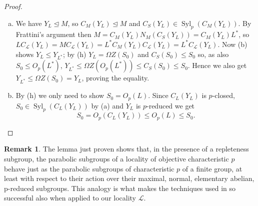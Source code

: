 \documentclass{amsart}
\numberwithin{equation}{section}
\theoremstyle{definition}
\newtheorem{remark}[equation]{Remark}
\theoremstyle{subresult}
\theoremstyle{caseresult}
\renewcommand{\L}{\mathcal{L}}
\newcommand{\Syl}{\operatorname{Syl}}
\newcommand{\norm}{\trianglelefteq}
\newcommand{\<}{\langle}
\renewcommand{\>}{\rangle}
\begin{document}
\begin{proof}
\begin{enumerate}[(a)]
Since $S_0 \norm S$ we get $S \le L_0$, thus $L_0$ is of characteristic $p$. Applying (g) to the pair $L_0 \le L$ we get $Y_{L_0} = Y_L$. Since $L_0$ is a parabolic subgroup of $\L$, always by (f) we have
\[
Y_L =Y_{L_0} \le \Omega Z(O_p(L_0)).
\]
Let $U$ be the unique maximal, normal subgroup of $L_0$ acting nilpotently on $\Omega Z(O_p(L_0))$; then $U$ acts nilpotently also on $Y_{L_0}$ and \cite[Lemma A.10]{Meier-Stell-Stroth:2012} shows that $U \le C_{L_0}(Y_{L_0})$. We get thus the following chain of inequalities
\[
O_p(L_0) \le U \cap S \le C_S(Y_{L_0}) = C_S(Y_L) = S_0 \le O_p(L_0), 
\]
which are therefore all equalities. This gives $O_p(L_0) = S_0$; since the generators of $O^p(U)$ act coprimely and nilpotently, we have $O^p(U) \le C_{L_0}(\Omega Z(O_p(L_0))) \le U$, where the latter inclusion holds by maximality of $U$. Then $U = (U \cap S)O^p(U) = (U \cap S) C_{L_0}(\Omega Z(O_p(L_0))) = C_{L_0}(\Omega Z(O_p(L_0)))$ as $U \cap S \le O_p(L_0)$. By the definition of $U$ and another application of \cite[Lemma A.10]{Meier-Stell-Stroth:2012}, $\Omega Z(O_p(L_0))$ is $p$-reduced for $L_0$, so we get
\[
Y_L \le \Omega Z(S_0) = \Omega Z (O_p(L_0)) \le Y_{L_0} = Y_L.
\]
Finally, $C_{L_0}(S_0) = C_{L_0}(O_p(L_0)) \le O_p(L_0) =S_0$, hence also $C_S(S_0) \le S_0$.
\item We have $Y_L \norm M$, so $C_M(Y_L) \norm M$ and $C_S(Y_L) \in \Syl_p(C_M(Y_L))$. By Frattini's argument then $M = C_M(Y_L) N_M(C_S(Y_L)) = C_M(Y_L) L^*$, so $LC_\L(Y_L) = M C_\L(Y_L) = L^* C_M(Y_L) C_\L(Y_L) = L^* C_\L(Y_L)$. Now (b) shows $Y_L \le Y_{L^*}$; by (h) $Y_L = \Omega Z(S_0)$ and $C_S(S_0) \le S_0$ so, as also $S_0 \le O_p(L^*)$, $Y_{L^*} \le \Omega Z(O_p(L^*)) \le C_S(S_0) \le S_0$. Hence we also get $Y_{L^*} \le \Omega Z(S_0) = Y_L$, proving the equality.
\item By (h) we only need to show $S_0 =  O_p(L)$. Since $C_L(Y_L)$ is $p$-closed,  $S_0 \in \Syl_p(C_L(Y_L))$ by (a) and $Y_L$ is $p$-reduced we get
\[
S_0 = O_p(C_L(Y_L)) \le O_p(L) \le S_0.
\]
\end{enumerate}
\end{proof}

\begin{remark}
    The lemma just proven shows that, in the presence of a repleteness subgroup, the parabolic subgroups of a locality of objective characteristic $p$ behave just as the parabolic subgroups of characteristic $p$ of a finite group, at least with respect to their action over their maximal, normal, elementary abelian, p-reduced subgroups. This analogy is what makes the techniques used in \cite{Meier-Stell-Stroth:2012} so successful also when applied to our locality $\L$.
\end{remark}
\end{document}

